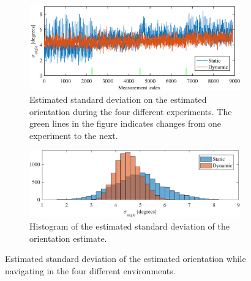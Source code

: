 \begin{figure}[htbp]
	\begin{subfigure}[t]{1\textwidth}	
		\centering	
		\includegraphics[scale=1.0]{chapters/evaluation/figures/location_data_angle}
		\caption{Estimated standard deviation on the estimated orientation during the four different experiments. The green lines in the figure indicates changes from one experiment to the next.}
		\label{fig:location_data_angle}
	\end{subfigure}
	\begin{subfigure}[t]{1\textwidth}
		\centering
		\includegraphics[scale=1.0]{chapters/evaluation/figures/location_data_hist_angle-crop}
		\caption{Histogram of the estimated standard deviation of the orientation estimate.}
		\label{fig:location_data_hist_angle}
	\end{subfigure}
	\caption{Estimated standard deviation of the estimated orientation while navigating in the four different environments.}
	\label{fig:location_angle_evaluation}
\end{figure}

